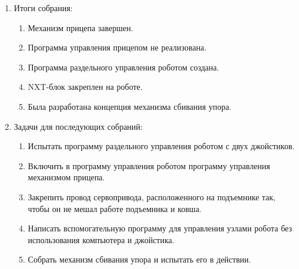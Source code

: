 \begin{enumerate}
	\item Итоги собрания: \newline
	\begin{enumerate}
		\item Механизм прицепа завершен.\newline
		
		\item Программа управления прицепом не реализована.\newline
		
		\item Программа раздельного управления роботом создана.\newline
		
		\item NXT-блок закреплен на роботе.\newline
		
		\item Была разработана концепция механизма сбивания упора.\newline
		
	\end{enumerate}
	
	\item Задачи для последующих собраний:\newline
	\begin{enumerate}
		\item Испытать программу раздельного управления роботом с двух джойстиков.\newline
		
		\item Включить в программу управления роботом программу управления механизмом прицепа.\newline
		
		\item Закрепить провод сервопривода, расположенного на подъемнике так, чтобы он не мешал работе подъемника и ковша.\newline
		
		\item Написать вспомогательную программу для управления узлами робота без использования компъютера и джойстика.\newline
		
		\item Собрать механизм сбивания упора и испытать его в действии.\newline
		
	\end{enumerate}     
\end{enumerate}

\fillpage

